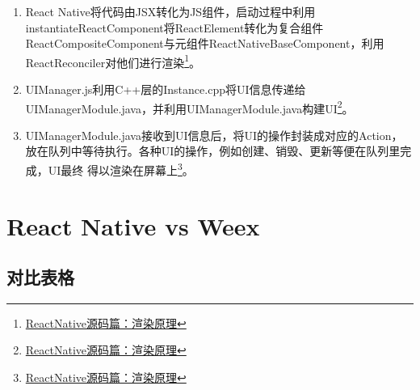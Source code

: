 \begin{enumerate}
\def\labelenumi{\arabic{enumi}.}
\tightlist
\item
  React
  Native将代码由JSX转化为JS组件，启动过程中利用instantiateReactComponent将ReactElement转化为复合组件ReactCompositeComponent与元组件ReactNativeBaseComponent，利用
  ReactReconciler对他们进行渲染\footnote{\href{https://github.com/guoxiaoxing/react-native/blob/master/doc/ReactNative\%E6\%BA\%90\%E7\%A0\%81\%E7\%AF\%87/4ReactNative\%E6\%BA\%90\%E7\%A0\%81\%E7\%AF\%87\%EF\%BC\%9A\%E6\%B8\%B2\%E6\%9F\%93\%E5\%8E\%9F\%E7\%90\%86.md}{ReactNative源码篇：渲染原理}}。
\item
  UIManager.js利用C++层的Instance.cpp将UI信息传递给UIManagerModule.java，并利用UIManagerModule.java构建UI\footnote{\href{https://github.com/guoxiaoxing/react-native/blob/master/doc/ReactNative\%E6\%BA\%90\%E7\%A0\%81\%E7\%AF\%87/4ReactNative\%E6\%BA\%90\%E7\%A0\%81\%E7\%AF\%87\%EF\%BC\%9A\%E6\%B8\%B2\%E6\%9F\%93\%E5\%8E\%9F\%E7\%90\%86.md}{ReactNative源码篇：渲染原理}}。
\item
  UIManagerModule.java接收到UI信息后，将UI的操作封装成对应的Action，放在队列中等待执行。各种UI的操作，例如创建、销毁、更新等便在队列里完成，UI最终
  得以渲染在屏幕上\footnote{\href{https://github.com/guoxiaoxing/react-native/blob/master/doc/ReactNative\%E6\%BA\%90\%E7\%A0\%81\%E7\%AF\%87/4ReactNative\%E6\%BA\%90\%E7\%A0\%81\%E7\%AF\%87\%EF\%BC\%9A\%E6\%B8\%B2\%E6\%9F\%93\%E5\%8E\%9F\%E7\%90\%86.md}{ReactNative源码篇：渲染原理}}。
\end{enumerate}

\section{React Native vs Weex}\label{react-native-vs-weex}

\subsection{对比表格}\label{ux5bf9ux6bd4ux8868ux683c}

